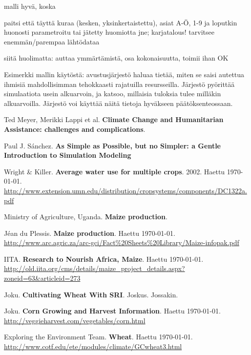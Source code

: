 \documentclass[12pt]{scrreprt}
\renewcommand\emph{\textbf}
\begin{document}
malli hyvä, koska

paitsi että täyttä kuraa (kesken, yksinkertaistettu), asiat A-Ö, 1-9 ja loputkin huonosti parametroitu tai jätetty huomiotta jne; karjatalous! tarvitsee enemmän/parempaa lähtödataa

siitä huolimatta: auttaa ymmärtämistä, osa kokonaisuutta, toimii ihan OK

Esimerkki mallin käytöstä: avustusjärjestö haluaa tietää, miten se saisi autettua ihmisiä mahdollisimman tehokkaasti rajatuilla resursseilla. Järjestö pyörittää simulaatiota usein alkuarvoin, ja katsoo, millaisia tuloksia tulee milläkin alkuarvoilla. Järjestö voi käyttää näitä tietoja hyväkseen päätöksenteossaan.

  \begin{thebibliography}{9}
  
  	Ted Meyer, Merikki Lappi et al.
  	\emph{Climate Change and Humanitarian Assistance: challenges and complications}.
  	
  	Paul J. Sánchez.
  	\emph{As Simple as Possible, but no Simpler: a Gentle Introduction to Simulation Modeling}

    Wright \& Killer.
    \emph{Average water use for multiple crops}.
    2002.
    Haettu \today. \\
    \url{http://www.extension.umn.edu/distribution/cropsystems/components/DC1322a.pdf}

    Ministry of Agriculture, Uganda.
    \emph{Maize production}.

    Jéan du Plessis.
    \emph{Maize production}.
    Haettu \today. \\
    \url{http://www.arc.agric.za/arc-gci/Fact%20Sheets%20Library/Maize-infopak.pdf}

    IITA.
    \emph{Research to Nourish Africa, Maize}.
    Haettu \today. \\
    \url{http://old.iita.org/cms/details/maize_project_details.aspx?zoneid=63&articleid=273}

    Joku.
    \emph{Cultivating Wheat With SRI}.
    Joskus.
    Jossakin.

    Joku.
    \emph{Corn Growing and Harvest Information}.
    Haettu \today. \\
    \url{http://veggieharvest.com/vegetables/corn.html}

    Exploring the Environment Team.
    \emph{Wheat}.
    Haettu \today. \\
    \url{http://www.cotf.edu/ete/modules/climate/GCwheat3.html}


\end{thebibliography}
\end{document}
